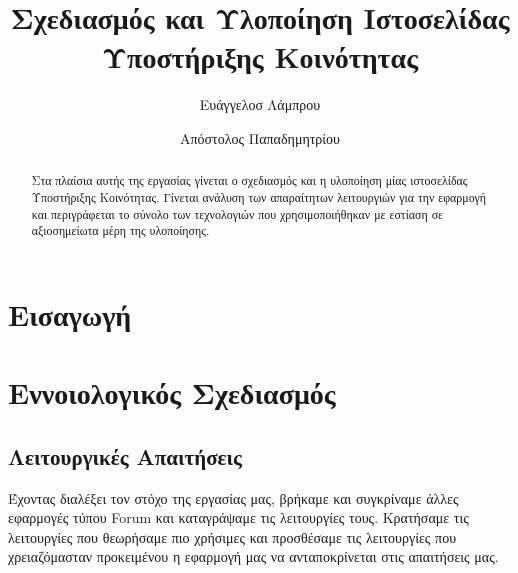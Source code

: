\documentclass[acmtog, nonacm, language=english, language=greek]{acmart}
\newcommand{\en}[1]{\textlatin{#1}}
\begin{document}
\title{Σχεδιασμός και Υλοποίηση Ιστοσελίδας Υποστήριξης Κοινότητας}

\author{Ευάγγελοσ Λάμπρου}
\orcid{}

\author{Απόστολος Παπαδημητρίου}

\begin{abstract}
    Στα πλαίσια αυτής της εργασίας γίνεται ο σχεδιασμός και η υλοποίηση μίας 
    ιστοσελίδας Υποστήριξης Κοινότητας. Γίνεται ανάλυση των απαραίτητων 
    λειτουργιών για την εφαρμογή και περιγράφεται το σύνολο των τεχνολογιών 
    που χρησιμοποιήθηκαν με εστίαση σε αξιοσημείωτα μέρη της υλοποίησης.
\end{abstract}

\maketitle

\section{Εισαγωγή}

\section{Εννοιολογικός Σχεδιασμός}

\subsection{Λειτουργικές Απαιτήσεις}

Έχοντας διαλέξει τον στόχο της εργασίας μας, βρήκαμε και συγκρίναμε άλλες εφαρμογές τύπου \en{Forum} και καταγράψαμε τις λειτουργίες τους.
Κρατήσαμε τις λειτουργίες που θεωρήσαμε πιο χρήσιμες και προσθέσαμε τις λειτουργίες που χρειαζόμασταν προκειμένου η εφαρμογή μας να ανταποκρίνεται στις απαιτήσεις μας.
\end{document}
